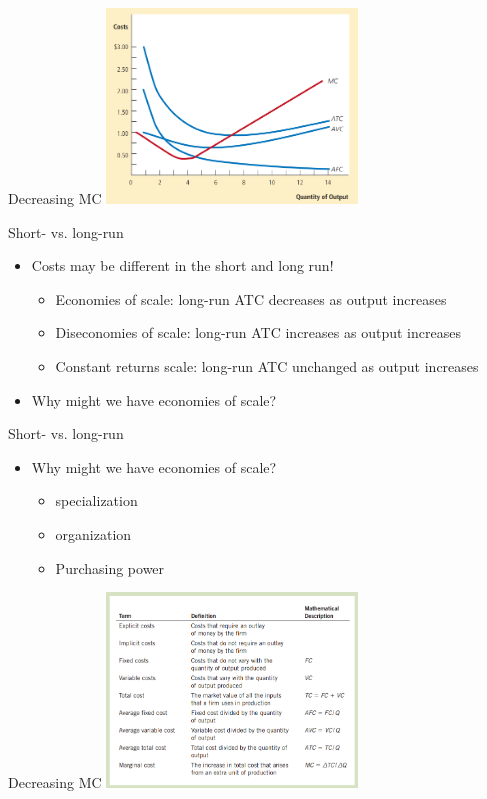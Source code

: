 \documentclass[aspectratio=169]{beamer}
\begin{document}
\begin{frame}{Decreasing MC}
    \centering
    \includegraphics[width = 0.5\textwidth,keepaspectratio]{decreasingMC.png}
\end{frame}

\begin{frame}{Short- vs. long-run}
    \begin{itemize}
        \item Costs may be different in the short and long run!
            \begin{itemize}
                \item Economies of scale: long-run ATC decreases as output increases
                \item Diseconomies of scale: long-run ATC increases as output increases
                \item Constant returns scale: long-run ATC unchanged as output increases 
            \end{itemize}
        \item Why might we have economies of scale?
    \end{itemize}
\end{frame}

\begin{frame}{Short- vs. long-run}
    \begin{itemize}
        \item Why might we have economies of scale?
            \begin{itemize}
                \item specialization
                \item organization
                \item Purchasing power
            \end{itemize}
    \end{itemize}
\end{frame}

\begin{frame}{Decreasing MC}
    \centering
    \includegraphics[width = 0.5\textwidth,keepaspectratio]{summary.png}
\end{frame}
\end{document}
